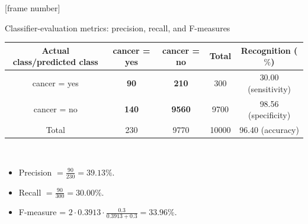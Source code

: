 \documentclass[aspectratio=169,t,table]{beamer}
\begin{document}
  {
    [frame number]
    \begin{frame}{Classifier-evaluation metrics: precision, recall, and F-measures}
      \centering
      \begin{tabular}{|c|c|c|c|c|}
        \hline
        Actual class/predicted class & cancer = yes & cancer = no & Total & Recognition ($\%$) \\\hline
        cancer = yes & \textbf{90} & \textbf{210} & 300 & 30.00 (sensitivity) \\\hline
        cancer = no & \textbf{140} & \textbf{9560} & 9700 & 98.56 (specificity) \\\hline
        Total & 230 & 9770 & 10000 & 96.40 (accuracy) \\\hline
      \end{tabular}\\[0.2cm]
      \begin{itemize}
        \item Precision $= \frac{90}{230} = 39.13 \%$.
        \item Recall $=\frac{90}{300} = 30.00 \%$.
        \item F-measure = $2 \cdot 0.3913 \cdot \frac{0.3}{0.3913 + 0.3} = 33.96 \%$.
      \end{itemize}
    \end{frame}
  }
\end{document}
